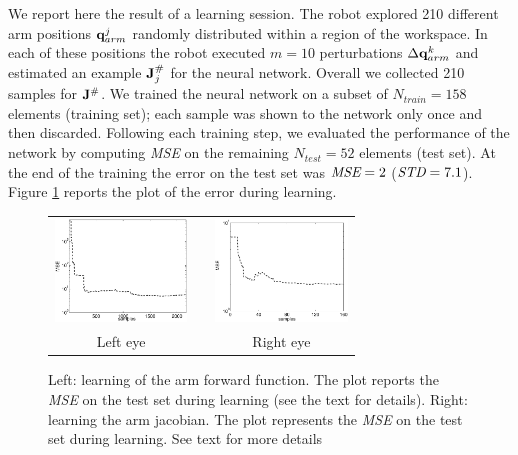 We report here the result of a learning session. The robot explored 210 
different arm positions $\mathbf q_{arm}^j$ randomly distributed within a region of 
the workspace. In each of these positions the robot executed $m=10$ 
perturbations $\Delta \mathbf {q}_{arm}^k$ and estimated an example $\mathbf J^\#_j$ for 
the neural network. Overall we collected 210 samples for $\mathbf J^\#$. 
We trained the neural network on a subset of $N_{train}=158$ elements 
(training set); each 
sample was shown to the network only once and then discarded. Following each 
training step, we evaluated the performance of the network by computing 
\emph{MSE} on the remaining $N_{test}=52$ elements 
(test set). At the 
end of the training the error on the test set was $\emph{MSE}=2$ 
($\emph{STD}=7.1$). Figure \ref{Fig:learningerrors} reports the plot of 
the error during learning.
%
\begin{figure}
  \begin{center}
	\begin{tabular}{ccc}
	  \parbox{30mm}{\includegraphics[width=35mm]{./Figure/reachingError1.eps}}  & \hspace{.1cm} &
	  \parbox{30mm}{\includegraphics[width=35mm]{./Figure/jacobian-error.eps}}
	  \\
	  \parbox{30mm}{\centering Left eye } & \hspace{0.1cm} & \parbox{30mm}{\centering Right eye }
  \end{tabular}
\end{center}
\caption{Left: learning of the arm forward function. The plot reports the 
\emph{MSE} on the test set during learning (see the text for details). 
Right: learning the arm jacobian. The plot represents the \emph{MSE} on 
the test set during learning. See text for more details}\label{Fig:learningerrors}
\end{figure}

